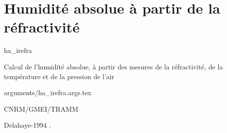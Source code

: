 %
\section{Humidit\'e absolue \`a partir de la r\'efractivit\'e}

 {\sf ha\_irefra}

Calcul de l'humidit\'e absolue, \`a 
partir des mesures de la r\'efractivit\'e, de la temp\'erature 
et de la pression de l'air

\bigskip
 {arguments/ha_irefra.args.tex}




CNRM/GMEI/TRAMM

Delahaye-1994 \cite{Delahaye-94}.
